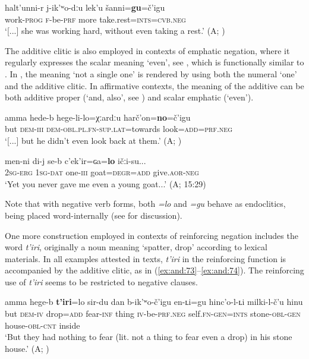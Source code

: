 \documentclass[output=paper,colorlinks=true, citecolor=brown]{langscibook}
\begin{document}
\ea
    \label{ex:and:70} 
    \gll  [...] halt’unni-r j-ik’ʷo-dːu lek’u šanni=\textbf{gu}=č’igu\\
          {} work-\textsc{prog} \textsc{f-}be-\textsc{prf} more take.rest=\textsc{ints=cvb.neg} \\
    \glt ‘[...] she was working hard, without even taking a rest.’ (A; ) 
\z 
        
The additive clitic is also employed in contexts of emphatic negation, where it regularly expresses the scalar meaning ‘even’, see , which is functionally similar to . In , the meaning ‘not a single one’ is rendered by using both the numeral ‘one’ and the additive clitic. In affirmative contexts, the meaning of the additive can be both additive proper (‘and, also’, see ) and scalar emphatic (‘even’).

\ea
    \label{ex:and:71} 
    \gll [...] amma hede{}-b hege{}-li{}-lo=χːardːu harč’on=\textbf{no}=č’igu\\
          {} but \textsc{dem-iii} \textsc{dem-obl.pl.fn{}-sup.lat}=towards look\textsc{=add}=\textsc{prf.neg}\\
    \glt ‘[...] but he didn’t even look back at them.’ (A; )
\z 

\ea
    \label{ex:and:72}
    \gll men{}-ni di{}-j se{}-b c’ek’ir=ɢa=\textbf{lo} ičːi{}-su...\\
          \textsc{2sg}{}-\textsc{erg} \textsc{1sg}-\textsc{dat} one-\textsc{iii} goat=\textsc{degr=add} give.\textsc{aor{}-neg} \\
    \glt ‘Yet you never gave me even a young goat...’ (A;  15:29)
\z 

Note that with negative verb forms, both \textit{=lo} and \textit{=gu} behave as endoclitics, being placed word-internally (see  for discussion).

One more construction employed in contexts of reinforcing negation includes the word \textit{t’iri}, originally a noun meaning ‘spatter, drop’ according to  lexical materials. In all examples attested in texts, \textit{t’iri} in the reinforcing function is accompanied by the additive clitic, as in (\ref{ex:and:73}–\ref{ex:and:74}). The reinforcing use of \textit{t’iri} seems to be restricted to negative clauses.

\ea
    \label{ex:and:73} 
    \gll amma hege{}-b \textbf{t’iri}=lo sir{}-du dan b{}-ik’ʷo{}-č’igu en-ʟi=gu hinc’o-l-ʟi milki-l-č’u hinu \\
          but \textsc{dem-iv} drop=\textsc{add} fear-\textsc{inf} thing \textsc{iv}{}-be-\textsc{prf.neg} self.\textsc{fn}{}-\textsc{gen=ints} stone\textsc{{}-obl}{}-\textsc{gen} house\textsc{{}-obl}{}-\textsc{cnt} inside \\
    \glt ‘But they had nothing to fear (lit. not a thing to fear even a drop) in his stone house.’ (A; )
\z      
\end{document}
